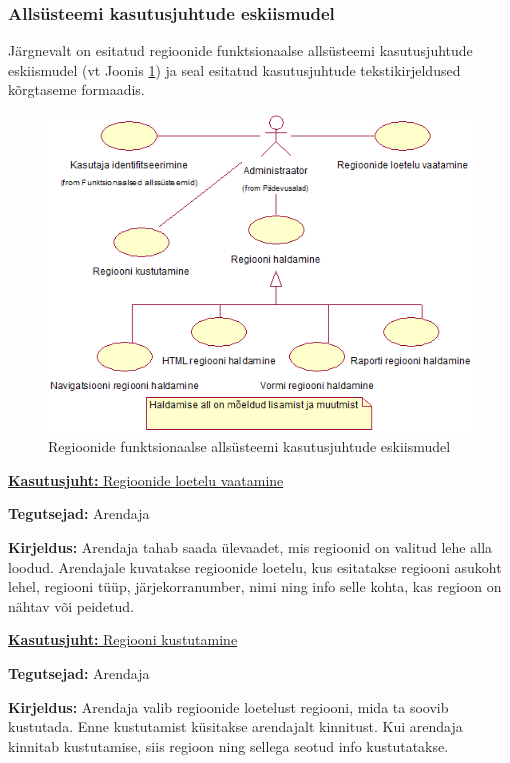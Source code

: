 \documentclass[a4paper,12pt]{article} %
\begin{document}
\subsubsection{Allsüsteemi kasutusjuhtude eskiismudel}
Järgnevalt on esitatud regioonide funktsionaalse allsüsteemi kasutusjuhtude eskiismudel (vt Joonis \ref{fig_regioonide_funktsionaalse_allsüsteemi_kasutusjuhtude_eskiismudel}) ja seal esitatud kasutusjuhtude tekstikirjeldused kõrgtaseme formaadis.
\begin{figure}[H]
\begin{center}
\includegraphics[bb=0 0 531 399,scale=1]{./diagrams/regions-subsystem-use-case-digram.png}
\caption{Regioonide funktsionaalse allsüsteemi kasutusjuhtude eskiismudel}
\label{fig_regioonide_funktsionaalse_allsüsteemi_kasutusjuhtude_eskiismudel}
\end{center}
\end{figure}

\underline{\textbf{Kasutusjuht:} Regioonide loetelu vaatamine}
\par
\textbf{Tegutsejad:} Arendaja
\par
\textbf{Kirjeldus:} Arendaja tahab saada ülevaadet, mis regioonid on valitud lehe alla loodud. Arendajale kuvatakse regioonide loetelu, kus esitatakse regiooni asukoht lehel, regiooni tüüp, järjekorranumber, nimi ning info selle kohta, kas regioon on nähtav või peidetud.
\par

\underline{\textbf{Kasutusjuht:} Regiooni kustutamine}
\par
\textbf{Tegutsejad:} Arendaja
\par
\textbf{Kirjeldus:} Arendaja valib regioonide loetelust regiooni, mida ta soovib kustutada. Enne kustutamist küsitakse arendajalt kinnitust. Kui arendaja kinnitab kustutamise, siis regioon ning sellega seotud info kustutatakse.
\end{document}
